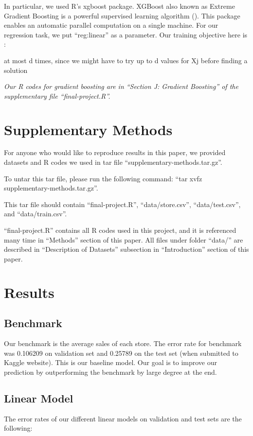 \documentclass[letterpaper,twocolumn,11pt]{article}
\begin{document}
In particular, we used R's xgboost package. XGBoost also known as Extreme Gradient Boosting is a powerful supervised learning algorithm (). This package enables an automatic parallel computation on a single machine. For our regression task, we put ``reg:linear'' as a parameter. Our training objective here is :

at most d times, since we might have to try up to d values for Xj before finding a solution

\textit{Our R codes for gradient boosting are in ``Section J: Gradient Boosting'' of the supplementary file ``final-project.R''.}

\section{Supplementary Methods}
For anyone who would like to reproduce results in this paper, we provided datasets and R codes we used in tar file ``supplementary-methods.tar.gz''.

To untar this tar file, please run the following command: ``tar xvfz supplementary-methods.tar.gz''.

This tar file should contain ``final-project.R'', ``data/store.csv'', ``data/test.csv'', and ``data/train.csv''.

``final-project.R'' contains all R codes used in this project, and it is referenced many time in ``Methods'' section of this paper. All files under folder ``data/'' are described in ``Description of Datasets'' subsection in ``Introduction'' section of this paper.

\section{Results}
\subsection{Benchmark}
Our benchmark is the average sales of each store. The error rate for benchmark was 0.106209 on validation set and 0.25789 on the test set (when submitted to Kaggle website). This is our baseline model. Our goal is to improve our prediction by outperforming the benchmark by large degree at the end. 

\subsection{Linear Model}
The error rates of our different linear models on validation and test sets are the following:
\end{document}

